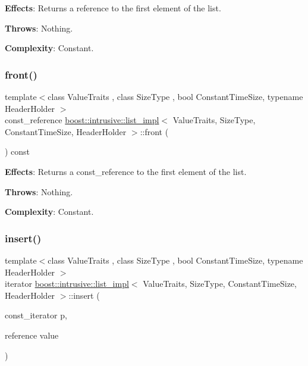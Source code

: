 {\bfseries Effects}\+: Returns a reference to the first element of the list.

{\bfseries Throws}\+: Nothing.

{\bfseries Complexity}\+: Constant. \mbox{\label{classboost_1_1intrusive_1_1list__impl_a51eb323fe6d3cc6c590886a7514dbb27}} 
\subsubsection{\texorpdfstring{front()}{front()}\hspace{0.1cm}{\footnotesize\ttfamily [2/2]}}
{\footnotesize\ttfamily template$<$class Value\+Traits , class Size\+Type , bool Constant\+Time\+Size, typename Header\+Holder $>$ \\
const\+\_\+reference \hyperlink{classboost_1_1intrusive_1_1list__impl}{boost\+::intrusive\+::list\+\_\+impl}$<$ Value\+Traits, Size\+Type, Constant\+Time\+Size, Header\+Holder $>$\+::front (\begin{DoxyParamCaption}{ }\end{DoxyParamCaption}) const\hspace{0.3cm}{\ttfamily [inline]}}

{\bfseries Effects}\+: Returns a const\+\_\+reference to the first element of the list.

{\bfseries Throws}\+: Nothing.

{\bfseries Complexity}\+: Constant. \mbox{\label{classboost_1_1intrusive_1_1list__impl_a51f571f4048e3f3e7bcb944d6f82bca0}} 
\subsubsection{\texorpdfstring{insert()}{insert()}\hspace{0.1cm}{\footnotesize\ttfamily [1/2]}}
{\footnotesize\ttfamily template$<$class Value\+Traits , class Size\+Type , bool Constant\+Time\+Size, typename Header\+Holder $>$ \\
iterator \hyperlink{classboost_1_1intrusive_1_1list__impl}{boost\+::intrusive\+::list\+\_\+impl}$<$ Value\+Traits, Size\+Type, Constant\+Time\+Size, Header\+Holder $>$\+::insert (\begin{DoxyParamCaption}\item[{const\+\_\+iterator}]{p,  }\item[{reference}]{value }\end{DoxyParamCaption})\hspace{0.3cm}{\ttfamily [inline]}}

